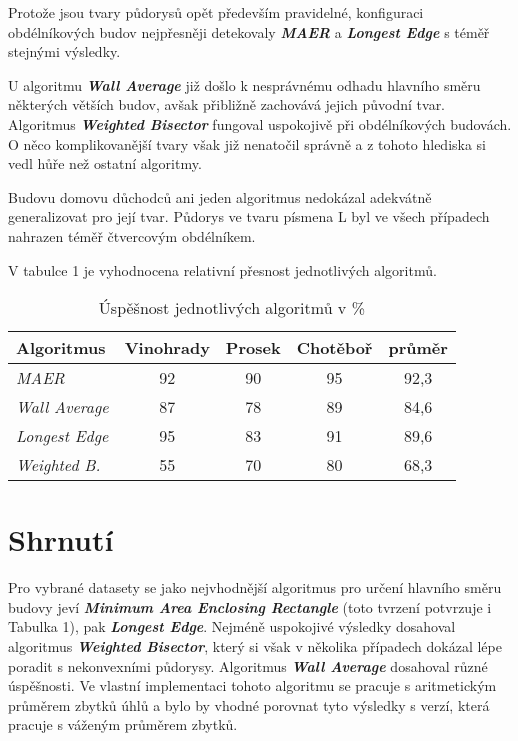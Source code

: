 \par Protože jsou tvary půdorysů opět především pravidelné, konfiguraci obdélníkových budov nejpřesněji detekovaly \textbf{\emph{MAER}} a \textbf{\emph{Longest Edge}} s téměř stejnými výsledky. 
\par U algoritmu \textbf{\emph{Wall Average}} již došlo k nesprávnému odhadu hlavního směru některých větších budov, avšak přibližně zachovává jejich původní tvar. Algoritmus \textbf{\emph{Weighted Bisector}} fungoval uspokojivě při obdélníkových budovách. O něco komplikovanější tvary však již nenatočil správně a z tohoto hlediska si vedl hůře než ostatní algoritmy.
\par Budovu domovu důchodců ani jeden algoritmus nedokázal adekvátně generalizovat pro její tvar. Půdorys ve tvaru písmena L byl ve všech případech nahrazen téměř čtvercovým obdélníkem.

\par V tabulce 1 je vyhodnocena relativní přesnost jednotlivých algoritmů.

\begin{table}[htbp]
    \centering
    \caption{ Úspěšnost jednotlivých algoritmů v \%}
    \begin{tabular}{|l||c||c||c||c|} 
     \hline\large
         \textbf{Algoritmus} & \textbf{Vinohrady} & \textbf{Prosek} & \textbf{Chotěboř} & \textbf{ průměr }\\ %
             \hline\hline
             \emph{\small MAER} & \small 92 &\small 90 & \small 95 & \small 92,3 \\
             \hline
             \emph{\small Wall Average} & \small 87 &\small 78 & \small 89 & \small 84,6 \\
             \hline
             \emph{\small Longest Edge} & \small 95 &\small 83 & \small 91 & \small 89,6 \\
             \hline
             \emph{\small Weighted B.} & \small 55 &\small 70 & \small 80 & \small 68,3 \\
             \hline
    \end{tabular}
\end{table}

\section*{Shrnutí}

\par Pro vybrané datasety se jako nejvhodnější algoritmus pro určení hlavního směru budovy jeví \textbf{\emph{Minimum Area Enclosing Rectangle}} (toto tvrzení potvrzuje i Tabulka 1), pak \textbf{\emph{Longest Edge}}. Nejméně uspokojivé výsledky dosahoval algoritmus \textbf{\emph{Weighted Bisector}}, který si však v několika případech dokázal lépe poradit s nekonvexními půdorysy. Algoritmus \textbf{\emph{Wall Average}} dosahoval různé úspěšnosti. Ve vlastní implementaci tohoto algoritmu se pracuje s aritmetickým průměrem zbytků úhlů a bylo by vhodné porovnat tyto výsledky s verzí, která pracuje s váženým průměrem zbytků.